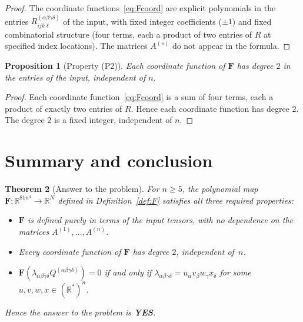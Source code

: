 \documentclass[12pt]{article}
\newtheorem{theorem}{Theorem}[section]
\newtheorem{proposition}[theorem]{Proposition}
\newcommand{\R}{\mathbb{R}}
\begin{document}
\begin{proof}
The coordinate functions~\eqref{eq:Fcoord} are explicit polynomials in the entries
$R^{(\alpha\beta\gamma\delta)}_{ijk\ell}$ of the input, with fixed integer coefficients
($\pm 1$) and fixed combinatorial structure (four terms, each a product of two entries
of $R$ at specified index locations).  The matrices $A^{(s)}$ do not appear in the formula.
\end{proof}

\begin{proposition}[Property (P2)]\label{prop:P2}
Each coordinate function of $\mathbf{F}$ has degree $2$ in the entries of the input,
independent of $n$.
\end{proposition}

\begin{proof}
Each coordinate function~\eqref{eq:Fcoord} is a sum of four terms, each a product of
exactly two entries of $R$.  Hence each coordinate function has degree $2$.  The degree
$2$ is a fixed integer, independent of $n$.
\end{proof}

\section{Summary and conclusion}

\begin{theorem}[Answer to the problem]\label{thm:answer}
For $n\geq 5$, the polynomial map $\mathbf{F}:\R^{81n^4}\to\R^N$ defined in
Definition~\ref{def:F} satisfies all three required properties:
\begin{itemize}
  \item[\textup{(P1)}] $\mathbf{F}$ is defined purely in terms of the input tensors, with no
        dependence on the matrices $A^{(1)},\dots,A^{(n)}$.
  \item[\textup{(P2)}] Every coordinate function of $\mathbf{F}$ has degree $2$,
        independent of~$n$.
  \item[\textup{(P3)}] $\mathbf{F}(\lambda_{\alpha\beta\gamma\delta}Q^{(\alpha\beta\gamma\delta)})=0$
        if and only if $\lambda_{\alpha\beta\gamma\delta}=u_\alpha v_\beta w_\gamma x_\delta$
        for some $u,v,w,x\in(\R^*)^n$.
\end{itemize}
Hence the answer to the problem is \textbf{YES}.
\end{theorem}
\end{document}
